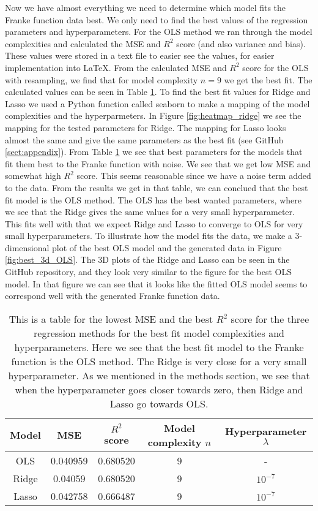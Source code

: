\documentclass[12pt,a4paper,english]{article}
\begin{document}
Now we have almost everything we need to determine which model fits the Franke function data best. We only need to find the best values of the regression parameters and hyperparameters. For the OLS method we ran through the model complexities and calculated the MSE and $R^2$ score (and also variance and bias). These values were stored in a text file to easier see the values, for easier implementation into LaTeX. From the calculated MSE and $R^2$ score for the OLS with resampling, we find that for model complexity $n=9$ we get the best fit. The calculated values can be seen in Table \ref{tab:best_val}. To find the best fit values for Ridge and Lasso we used a Python function called seaborn to make a mapping of the model complexities and the hyperparmeters. In Figure \ref{fig:heatmap_ridge} we see the mapping for the tested parameters for Ridge. The mapping for Lasso looks almost the same and give the same parameters as the best fit (see GitHub \ref{sect:appendix}). From Table \ref{tab:best_val} we see that best parameters for the models that fit them best to the Franke function with noise. We see that we get low MSE and somewhat high $R^2$ score. This seems reasonable since we have a noise term added to the data. From the results we get in that table, we can conclued that the best fit model is the OLS method. The OLS has the best wanted parameters, where we see that the Ridge gives the same values for a very small hyperparameter. This fits well with that we expect Ridge and Lasso to converge to OLS for very small hyperparameters. To illustrate how the model fits the data, we make a 3-dimensional plot of the best OLS model and the generated data in Figure \ref{fig:best_3d_OLS}. The 3D plots of the Ridge and Lasso can be seen in the GitHub repository, and they look very similar to the figure for the best OLS model. In that figure we can see that it looks like the fitted OLS model seems to correspond well with the generated Franke function data.

\begin{table}[h!]
	\centering
	\begin{tabular}{ |c|c|c|c|c| }
		\hline \rule{0pt}{13pt}
		Model& MSE & $R^2$ score & Model complexity $n$& Hyperparameter $\lambda$\\
		\hline \rule{0pt}{13pt}
		OLS & 0.040959 & 0.680520 & 9 & - \\
		\hline \rule{0pt}{13pt}
		Ridge & 0.04059 & 0.680520 & 9 & $10^{-7}$ \\
		\hline \rule{0pt}{13pt}
		Lasso & 0.042758 & 0.666487 & 9 & $10^{-7}$ \\
		\hline
	\end{tabular}	
	\caption{This is a table for the lowest MSE and the best $R^2$ score for the three regression methods for the best fit model complexities and hyperparameters. Here we see that the best fit model to the Franke function is the OLS method. The Ridge is very close for a very small hyperparameter. As we mentioned in the methods section, we see that when the hyperparameter goes closer towards zero, then Ridge and Lasso go towards OLS.}
	\label{tab:best_val}
\end{table}
\end{document}
